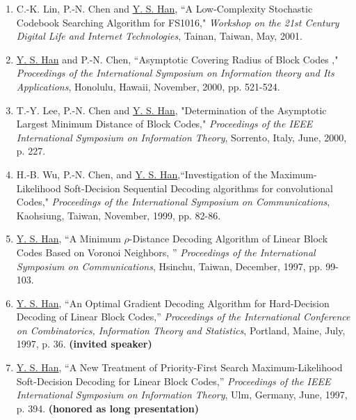 \begin{llist}
\begin{itemize}
\begin{enumerate}
\item C.-K. Lin, P.-N. Chen and \underline{Y. S. Han}, ``A
Low-Complexity Stochastic Codebook Searching Algorithm for
FS1016," {\it Workshop on the 21st Century Digital Life and
Internet Technologies}, Tainan, Taiwan, May, 2001.

\item \underline{Y. S. Han} and P.-N. Chen, ``Asymptotic Covering
Radius of Block Codes ," {\it Proceedings of the International
Symposium on Information theory and Its Applications},  Honolulu,
Hawaii, November, 2000, pp. 521-524.

\item T.-Y. Lee, P.-N. Chen and \underline{Y. S. Han},
"Determination of the Asymptotic Largest Minimum Distance of Block
Codes," {\it Proceedings of the IEEE International Symposium  on
Information Theory}, Sorrento, Italy, June, 2000, p. 227.

\item H.-B. Wu, P.-N. Chen, and \underline{Y. S.
Han},``Investigation of the Maximum-Likelihood Soft-Decision
Sequential Decoding algorithms for convolutional Codes," {\it
Proceedings of the International Symposium on Communications},
Kaohsiung, Taiwan, November, 1999, pp. 82-86.



\item \underline{Y. S. Han}, ``A Minimum $\rho$-Distance Decoding
Algorithm of Linear Block Codes Based on Voronoi Neighbors, ''
{\it Proceedings of the International Symposium on
Communications}, Hsinchu, Taiwan, December, 1997, pp. 99-103.

\item \underline{Y.  S.  Han},
 ``An Optimal  Gradient Decoding Algorithm  for
Hard-Decision Decoding of Linear Block Codes,'' {\it Proceedings
of the  International Conference on Combinatorics, Information
Theory and Statistics}, Portland, Maine, July, 1997, p. 36. {\bf
(invited speaker)}

\item  \underline{Y.  S.  Han},
 ``A New Treatment of Priority-First Search Maximum-Likelihood
Soft-Decision Decoding for Linear Block Codes,'' {\it Proceedings
of the IEEE International  Symposium  on Information Theory}, Ulm,
Germany, June, 1997, p. 394. {\bf (honored as long presentation)}


\end{enumerate}
\end{itemize}
\end{llist}
